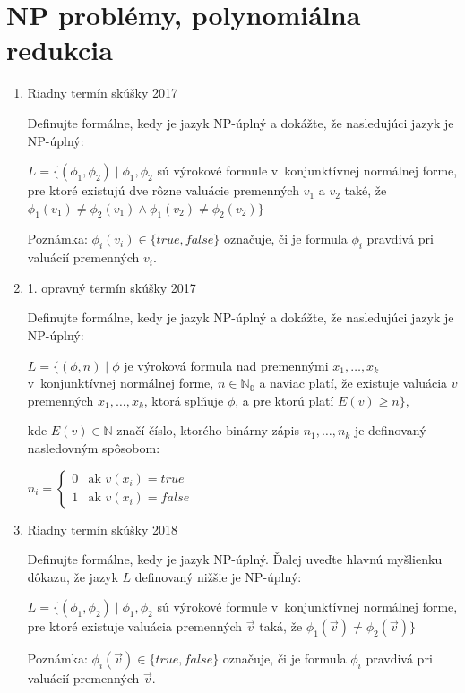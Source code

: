 \documentclass[]{article}
\begin{document}
	\section{NP problémy, polynomiálna redukcia}

	\begin{enumerate}
		\item Riadny termín skúšky 2017
		
		Definujte formálne, kedy je jazyk NP-úplný a dokážte, že nasledujúci jazyk je NP-úplný:
		
		$L = \{(\phi_1, \phi_2) \mid \phi_1, \phi_2$ sú výrokové formule v~konjunktívnej normálnej forme, pre ktoré existujú dve rôzne valuácie premenných $v_1$ a $v_2$ také, že $\phi_1(v_1) \neq \phi_2(v_1) \land \phi_1(v_2) \neq \phi_2(v_2)\}$
		
		Poznámka: $\phi_i(v_i) \in \{true, false\}$ označuje, či je formula $\phi_i$ pravdivá pri valuácií premenných $v_i$.
		
		\item 1. opravný termín skúšky 2017
		
		Definujte formálne, kedy je jazyk NP-úplný a dokážte, že nasledujúci jazyk je NP-úplný:
		
		$L = \{(\phi, n) \mid \phi$ je výroková formula nad premennými $x_1, \ldots, x_k$ v~konjunktívnej normálnej forme, $n \in \mathbb{N_0}$ a naviac platí, že existuje valuácia $v$ premenných $x_1, \ldots, x_k$, ktorá splňuje $\phi$, a pre ktorú platí $E(v) \geq n\}$,
		
		kde $E(v) \in \mathbb{N}$ značí číslo, ktorého binárny zápis $n_1, \ldots, n_k$ je definovaný nasledovným spôsobom:
		
		$n_i =
		\left\{
		\begin{array}{ll}
			0  & \mbox{ak } v(x_i) = true \\
			1 & \mbox{ak } v(x_i) = false
		\end{array}
		\right.$
		
		\item Riadny termín skúšky 2018
		
		Definujte formálne, kedy je jazyk NP-úplný. Ďalej uveďte hlavnú myšlienku dôkazu, že jazyk $L$ definovaný nižšie je NP-úplný:
		
		$L = \{(\phi_1, \phi_2) \mid \phi_1, \phi_2$ sú výrokové formule v~konjunktívnej normálnej forme, pre ktoré existuje valuácia premenných $\vec{v}$ taká, že $\phi_1(\vec{v}) \neq \phi_2(\vec{v})\}$
		
		Poznámka: $\phi_i(\vec{v}) \in \{true, false\}$ označuje, či je formula $\phi_i$ pravdivá pri valuácií premenných $\vec{v}$.
	\end{enumerate}
\end{document}
